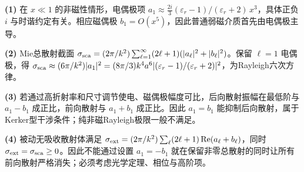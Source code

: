 \par\noindent\textbf{(1)} 在 \(x\ll1\) 的非磁性情形，电偶极项 \(a_1\approx\frac{2i}{3}(\varepsilon_r-1)/(\varepsilon_r+2)\,x^3\)，具体正负 \(i\) 与时谐约定有关。相应磁偶极 \(b_1=O(x^5)\)，因此普通弱磁介质首先由电偶极主导。
\par\noindent\textbf{(2)} Mie总散射截面 \(\sigma_{\rm sca}=(2\pi/k^2)\sum_{\ell=1}^\infty(2\ell+1)(|a_\ell|^2+|b_\ell|^2)\)。保留 \(\ell=1\) 电偶极，得 \(\sigma_{\rm sca}\approx(6\pi/k^2)|a_1|^2=(8\pi/3)k^4a^6|(\varepsilon_r-1)/(\varepsilon_r+2)|^2\)，为Rayleigh六次方律。
\par\noindent\textbf{(3)} 若通过高折射率和尺寸调节使电、磁偶极幅度可比，后向散射振幅在最低阶与 \(a_1-b_1\) 成正比，前向散射与 \(a_1+b_1\) 成正比。因此 \(a_1=b_1\) 能抑制后向散射，属于Kerker型干涉条件；纯非磁Rayleigh极限一般不满足。
\par\noindent\textbf{(4)} 被动无吸收散射体满足 \(\sigma_{\rm ext}=(2\pi/k^2)\sum_\ell(2\ell+1)\operatorname{Re}(a_\ell+b_\ell)\)，同时 \(\sigma_{\rm ext}=\sigma_{\rm sca}\ge0\)。因此不能通过设置 \(a_1=-b_1\) 就在保留非零总散射的同时让所有前向散射严格消失；必须考虑光学定理、相位与高阶项。
